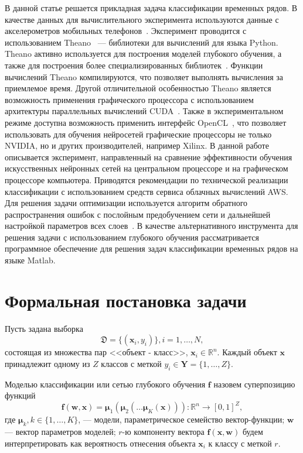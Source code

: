 \documentclass[12pt,notitlepage]{article}
\begin{document}
В данной статье решается прикладная задача классификации временных рядов. В качестве данных для вычислительного эксперимента используются данные с акселерометров мобильных телефонов~\cite{wisdm}. Эксперимент проводится с использованием Theano~\cite{theano1, theano2} --- библиотеки для вычислений для языка Python. Theano активно используется для построения моделей глубокого обучения, а также для построения более специализированных библиотек~\cite{lasagne, pylearn}. Функции вычислений Theano компилируются, что позволяет выполнять вычисления за приемлемое время. Другой отличительной особенностью Theano является возможность применения графического процессора с использованием архитектуры параллельных вычислений CUDA~\cite{cuda}. Также в экспериментальном режиме доступна возможность применить интерфейс OpenCL~\cite{cl}, что позволяет использовать для обучения нейросетей графические процессоры не только NVIDIA, но и других производителей, например Xilinx. В данной работе описывается эксперимент, направленный на сравнение эффективности обучения искусственных нейронных сетей на центральном процессоре и на графическом процессоре компьютера. Приводятся рекомендации по технической реализации классификации с использованием средств сервиса облачных вычислений AWS. Для решения задачи оптимизации используется алгоритм обратного распространения ошибок с послойным предобучением сети и дальнейшей настройкой параметров всех слоев~\cite{fine}.
В качестве альтернативного инструмента для решения задачи с использованием глубокого обучения рассматривается программное обеспечение для решения задач классификации временных рядов на языке Matlab.

\section{Формальная постановка задачи}
Пусть задана выборка \begin{equation}\label{eq:dataset}\mathfrak{D} = \{(\mathbf{x}_i,y_i)\}, i = 1,\dots,N,\end{equation} состоящая из множества пар <<объект - класс>>, $\mathbf{x}_i \in \mathbb{R}^n$. Каждый объект $\mathbf{x}$ принадлежит одному из $Z$ классов с меткой $y_i \in \mathbf{Y} = \{1,\dots,Z\}$.

Моделью классификации или сетью глубокого обучения $\mathbf{f}$ назовем суперпозицию функций
\begin{equation}
\label{eq:main}
 \mathbf{f}(\mathbf{w}, \mathbf{x}) = \boldsymbol{{\mu}}_1(\boldsymbol{\mu}_2(\dots \boldsymbol{\mu}_K(\mathbf{x}))): \mathbb{R}^n \to [0,1]^Z,
\end{equation}
где $\boldsymbol{\mu}_k, k \in \{1,\dots,K\}$, --- модели, параметрическое семейство вектор-функции; $\mathbf{w}$ --- вектор параметров моделей;
$r$-ю компоненту вектора $\mathbf{f}(\mathbf{x},\mathbf{w})$ будем интерпретировать как вероятность отнесения объекта $\mathbf{x}_i$ к классу с меткой $r$.
\end{document}
